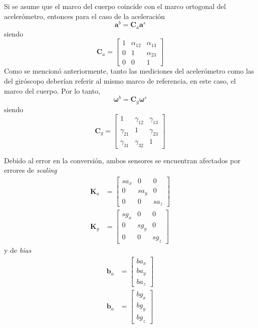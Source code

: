 Si se asume que el marco del cuerpo coincide con el marco ortogonal del acelerómetro, entonces para el caso de la aceleración
\begin{equation}
    \bm{a}^b = \bm{C}_a\bm{a}^s
\end{equation}
siendo
\begin{equation}
    \bm{C}_a =
    \begin{bmatrix}
        1 & \alpha_{12} & \alpha_{13} \\
        0 & 1 & \alpha_{23} \\
        0 & 0 & 1
    \end{bmatrix}
\end{equation}
Como se mencionó anteriormente, tanto las mediciones del acelerómetro como las del giróscopo deberían referir al mismo marco de referencia, en este caso, el marco del cuerpo. Por lo tanto,
\begin{equation}
    \bm{\omega}^b = \bm{C}_g\bm{\omega}^s
\end{equation}
siendo
\begin{equation}
    \bm{C}_g =
    \begin{bmatrix}
        1 & \gamma_{12} & \gamma_{13} \\
        \gamma_{21} & 1 & \gamma_{23} \\
        \gamma_{31} & \gamma_{32} & 1
    \end{bmatrix}
\end{equation}

Debido al error en la conversión, ambos sensores se encuentran afectados por errores de \textit{scaling}
\begin{align}
    \bm{K}_a &=
    \begin{bmatrix}
        sa_x & 0 & 0 \\
        0 & sa_y & 0 \\
        0 & 0 & sa_z
    \end{bmatrix}
    \\
    \bm{K}_g &=
    \begin{bmatrix}
        sg_x & 0 & 0 \\
        0 & sg_y & 0 \\
        0 & 0 & sg_z
    \end{bmatrix}
\end{align}
 y de \textit{bias}
 \begin{align}
    \bm{b}_a &=
    \begin{bmatrix}
        ba_x \\
        ba_y \\
        ba_z
    \end{bmatrix}
    \\
     \bm{b}_a &=
     \begin{bmatrix}
        bg_x \\
        bg_y \\
        bg_z
     \end{bmatrix}
\end{align}

